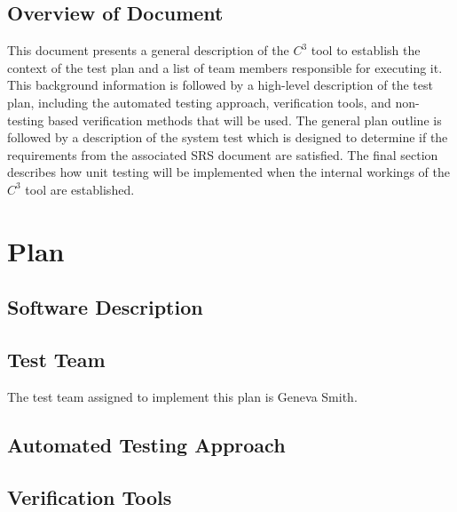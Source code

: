 \documentclass[12pt, titlepage]{article}
\newcommand{\prognameAbbrv}{$C^{3}$}
\begin{document}
\subsection{Overview of Document}
This document presents a general description of the \prognameAbbrv{} tool to 
establish the context of the test plan and a list of team members responsible 
for executing it. This background information is followed by a high-level 
description of the test plan, including the automated testing approach, 
verification tools, and non-testing based verification methods that will be 
used. The general plan outline is followed by a description of the system test 
which is designed to determine if the requirements from the associated SRS 
document are satisfied. The final section describes how unit testing will be 
implemented when the internal workings of the \prognameAbbrv{} tool are 
established.

\section{Plan}
\label{testplan_highlevel}
	
\subsection{Software Description}

\subsection{Test Team}

The test team assigned to implement this plan is Geneva Smith.

\subsection{Automated Testing Approach}

\subsection{Verification Tools}


		
\end{document}
